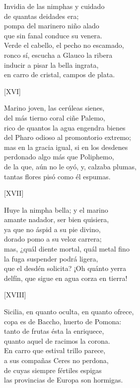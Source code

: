 \documentclass[11pt,a4paper,twoside]{article}
\newcommand{\guno}{\emph{G1}}
\begin{document}
Invidia de las nimphas y cuidado\\
de quantas \edtext{honra el mar}{\Afootnote{honra el amor {\guno}}} deidades era;\\
pompa del marinero niño alado\\
que sin fanal conduce su venera.\\
Verde el cabello, el pecho no escamado,\\
ronco sí, escucha a Glauco la ribera\\
inducir a pisar la bella ingrata,\\
en carro de cristal, campos de plata.\par\pend
\relax
\vfill
\newpage
%
\begin{center}
	[XVI]
\end{center}\pstart
Marino joven, las cerúleas sienes,\\
del más tierno coral ciñe Palemo,\\
rico de quantos la agua engendra bienes\\
del Pharo odioso al promontorio extremo;\\
mas en la gracia igual, si en los desdenes\\
perdonado algo más que Poliphemo,\\
de la que, aún no le oyó, y, calzaba plumas,\\
tantas flores pisó como él espumas.\par\pend
%
\begin{center}
	[XVII]
\end{center}\pstart
Huye la nimpha bella; y el marino\\
amante nadador, ser bien quisiera,\\
ya que no áspid a su pie divino,\\
dorado pomo a su veloz carrera;\\
mas, ¿quál diente mortal, quál metal fino\\
la fuga suspender podrá ligera,\\
que el desdén solicita? ¡Oh quánto yerra\\
delfín, que sigue en agua corza en tierra!\par\pend
%
\begin{center}
	[XVIII]
\end{center}\pstart
Sicilia, en quanto oculta, en quanto ofrece,\\
copa es de Baccho, huerto de Pomona:\\
tanto de frutas ésta la enriquece,\\
quanto aquel de racimos la corona.\\
En carro que estival trillo parece,\\
a sus compañas Ceres no perdona,\\
de cuyas siempre fértiles espigas\\
las provincias de Europa son hormigas.\par\pend
\end{document}
